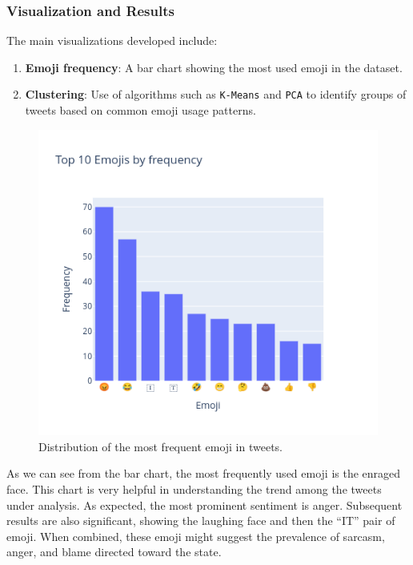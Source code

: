 \subsubsection{Visualization and Results}
The main visualizations developed include:
\begin{enumerate}
    \item \textbf{Emoji frequency}: A bar chart showing the most used emoji in the dataset.
    \item \textbf{Clustering}: Use of algorithms such as \texttt{K-Means} and \texttt{PCA} to identify groups of tweets based on common emoji usage patterns.
\end{enumerate}
\begin{figure}
    \includegraphics[width=\columnwidth]{../../results/images/emoji_top10.png}
    \caption{Distribution of the most frequent emoji in tweets.}
    \label{fig:emoji_frequenze}
\end{figure}
As we can see from the bar chart, the most frequently used emoji is the enraged face. This chart is very helpful in understanding the trend among the tweets under analysis. As expected, the most prominent sentiment is anger. Subsequent results are also significant, showing the laughing face and then the “IT” pair of emoji. When combined, these emoji might suggest the prevalence of sarcasm, anger, and blame directed toward the state.

